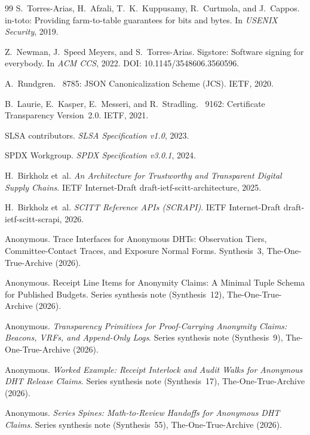 \documentclass[11pt]{article}
\begin{document}
\begin{thebibliography}{99}
S.~Torres-Arias, H.~Afzali, T.~K.~Kuppusamy, R.~Curtmola, and J.~Cappos.
\newblock in-toto: Providing farm-to-table guarantees for bits and bytes.
\newblock In \emph{USENIX Security}, 2019.

Z.~Newman, J.~Speed Meyers, and S.~Torres-Arias.
\newblock Sigstore: Software signing for everybody.
\newblock In \emph{ACM CCS}, 2022. DOI: 10.1145/3548606.3560596.

A.~Rundgren.
~8785: {JSON} Canonicalization Scheme ({JCS}).
\newblock IETF, 2020.

B.~Laurie, E.~Kasper, E.~Messeri, and R.~Stradling.
~9162: Certificate Transparency Version~2.0.
\newblock IETF, 2021.

SLSA contributors.
\newblock \emph{SLSA Specification v1.0}, 2023.

SPDX Workgroup.
\newblock \emph{SPDX Specification v3.0.1}, 2024.

H.~Birkholz et~al.
\newblock \emph{An Architecture for Trustworthy and Transparent Digital Supply Chains}.
\newblock IETF Internet-Draft draft-ietf-scitt-architecture, 2025.

H.~Birkholz et~al.
\newblock \emph{SCITT Reference APIs (SCRAPI)}.
\newblock IETF Internet-Draft draft-ietf-scitt-scrapi, 2026.

Anonymous.
\newblock Trace Interfaces for Anonymous DHTs: Observation Tiers, Committee-Contact Traces, and Exposure Normal Forms.
\newblock Synthesis~3, The-One-True-Archive (2026).

Anonymous.
\newblock Receipt Line Items for Anonymity Claims: A Minimal Tuple Schema for Published Budgets.
\newblock Series synthesis note (Synthesis~12), The-One-True-Archive (2026).

Anonymous.
\newblock \emph{Transparency Primitives for Proof-Carrying Anonymity Claims: Beacons, VRFs, and Append-Only Logs}.
\newblock Series synthesis note (Synthesis~9), The-One-True-Archive (2026).


Anonymous.
\newblock \emph{Worked Example: Receipt Interlock and Audit Walks for Anonymous DHT Release Claims}.
\newblock Series synthesis note (Synthesis~17), The-One-True-Archive (2026).

Anonymous.
\newblock \emph{Series Spines: Math-to-Review Handoffs for Anonymous DHT Claims}.
\newblock Series synthesis note (Synthesis~55), The-One-True-Archive (2026).


\end{thebibliography}
\end{document}
